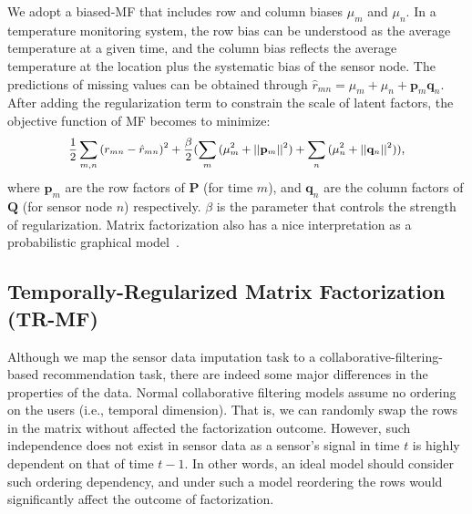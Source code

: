 We adopt a biased-MF that includes row and column biases $\mu_m$ and $\mu_n$. 
In a temperature monitoring system, the row bias can be understood as the average temperature at a given time, and the column bias reflects the average temperature at the location plus the systematic bias of the sensor node.
The predictions of missing values can be obtained through $\hat{r}_{mn} = \mu_m + \mu_n + \mathbf{p}_m \mathbf{q}_n$.
After adding the regularization term to constrain the scale of latent factors, the objective function of MF becomes to minimize:
\begin{equation*}\small \begin{aligned}
\frac{1}{2}\sum_{m,n}{(r_{mn} - \hat{r}_{mn})}^2
+ \frac{\beta}{2}(\sum_m{(\mu_m^2 + ||\mathbf{p}_m||^2)} + \sum_n{(\mu_n^2 + ||\mathbf{q}_n||^2)}),
\end{aligned}\end{equation*}
where $\mathbf{p}_m$ are the row factors of $\mathbf{P}$ (for time $m$), and $\mathbf{q}_n$ are the column factors of $\mathbf{Q}$ (for sensor node $n$) respectively.
$\beta$ is the parameter that controls the strength of regularization.
Matrix factorization also has a nice interpretation as a probabilistic graphical model~\cite{mnih2007probabilistic}.


\subsection{Temporally-Regularized Matrix Factorization (TR-MF)}

Although we map the sensor data imputation task to a collaborative-filtering-based recommendation task, there are indeed some major differences in the properties of the data.
Normal collaborative filtering models assume no ordering on the users (i.e., temporal dimension). That is, we can randomly swap the rows in the matrix without affected the factorization outcome. However, such independence does not exist in sensor data as a 
sensor's signal in time $t$ is highly dependent on that of time $t-1$. In other words, an ideal model should consider such ordering dependency, and under such a model reordering the
rows would significantly affect the outcome of factorization.



